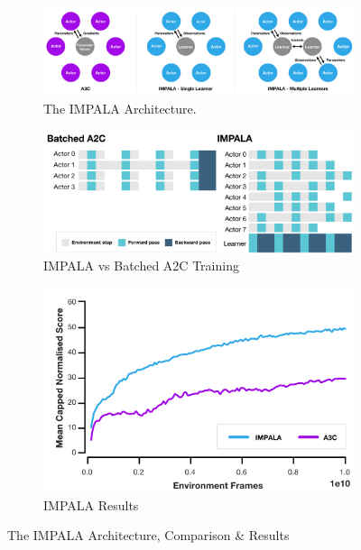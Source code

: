 \begin{figure}[!htb]
		\centering
		\begin{subfigure}[b]{0.3\textwidth}
				\centering
				\includegraphics[width=\textwidth]{figures/algos/impala.png}
				\caption{The IMPALA Architecture.}
				\label{fig:impala_arch}
		\end{subfigure}
		\hfill
		\begin{subfigure}[b]{0.3\textwidth}
				\centering
				\includegraphics[width=\textwidth]{figures/algos/impala_vs_a2c.png}
				\caption{IMPALA vs Batched A2C Training}
				\label{fig:impala_vs_a2c}
		\end{subfigure}
		\hfill
		\begin{subfigure}[b]{0.3\textwidth}
				\centering
				\includegraphics[width=\textwidth]{figures/algos/impala_results.png}
				\caption{IMPALA Results}
				\label{fig:impala_results}
		\end{subfigure}
		\hfill
		 \caption{The IMPALA Architecture, Comparison \& Results}
		 \label{fig:impala}
\end{figure}

